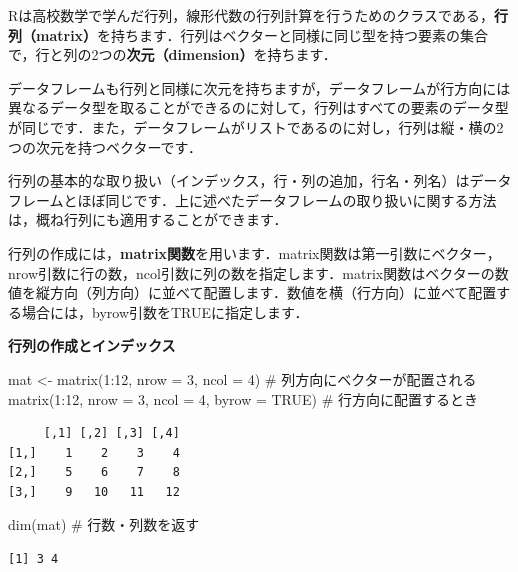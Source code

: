 \documentclass[
  letterpaper,
  DIV=11,
  numbers=noendperiod]{scrreprt}
\newenvironment{Shaded}{\begin{snugshade}}{\end{snugshade}}
\newcommand{\AttributeTok}[1]{\textcolor[rgb]{0.40,0.45,0.13}{#1}}
\newcommand{\CommentTok}[1]{\textcolor[rgb]{0.37,0.37,0.37}{#1}}
\newcommand{\ConstantTok}[1]{\textcolor[rgb]{0.56,0.35,0.01}{#1}}
\newcommand{\DecValTok}[1]{\textcolor[rgb]{0.68,0.00,0.00}{#1}}
\newcommand{\FunctionTok}[1]{\textcolor[rgb]{0.28,0.35,0.67}{#1}}
\newcommand{\NormalTok}[1]{\textcolor[rgb]{0.00,0.23,0.31}{#1}}
\newcommand{\OtherTok}[1]{\textcolor[rgb]{0.00,0.23,0.31}{#1}}
\newcommand{\SpecialCharTok}[1]{\textcolor[rgb]{0.37,0.37,0.37}{#1}}
\begin{document}
Rは高校数学で学んだ行列，線形代数の行列計算を行うためのクラスである，\textbf{行列（matrix）}を持ちます．行列はベクターと同様に同じ型を持つ要素の集合で，行と列の2つの\textbf{次元（dimension）}を持ちます．

データフレームも行列と同様に次元を持ちますが，データフレームが行方向には異なるデータ型を取ることができるのに対して，行列はすべての要素のデータ型が同じです．また，データフレームがリストであるのに対し，行列は縦・横の2つの次元を持つベクターです．

行列の基本的な取り扱い（インデックス，行・列の追加，行名・列名）はデータフレームとほぼ同じです．上に述べたデータフレームの取り扱いに関する方法は，概ね行列にも適用することができます．

行列の作成には，\textbf{matrix関数}を用います．matrix関数は第一引数にベクター，nrow引数に行の数，ncol引数に列の数を指定します．matrix関数はベクターの数値を縦方向（列方向）に並べて配置します．数値を横（行方向）に並べて配置する場合には，byrow引数をTRUEに指定します．

\textbf{行列の作成とインデックス}

\begin{Shaded}
\begin{Highlighting}[]
\NormalTok{mat }\OtherTok{\textless{}{-}} \FunctionTok{matrix}\NormalTok{(}\DecValTok{1}\SpecialCharTok{:}\DecValTok{12}\NormalTok{, }\AttributeTok{nrow =} \DecValTok{3}\NormalTok{, }\AttributeTok{ncol =} \DecValTok{4}\NormalTok{) }\CommentTok{\# 列方向にベクターが配置される}
\FunctionTok{matrix}\NormalTok{(}\DecValTok{1}\SpecialCharTok{:}\DecValTok{12}\NormalTok{, }\AttributeTok{nrow =} \DecValTok{3}\NormalTok{, }\AttributeTok{ncol =} \DecValTok{4}\NormalTok{, }\AttributeTok{byrow =} \ConstantTok{TRUE}\NormalTok{) }\CommentTok{\# 行方向に配置するとき}
\end{Highlighting}
\end{Shaded}

\begin{verbatim}
     [,1] [,2] [,3] [,4]
[1,]    1    2    3    4
[2,]    5    6    7    8
[3,]    9   10   11   12
\end{verbatim}

\begin{Shaded}
\begin{Highlighting}[]
\FunctionTok{dim}\NormalTok{(mat) }\CommentTok{\# 行数・列数を返す}
\end{Highlighting}
\end{Shaded}

\begin{verbatim}
[1] 3 4
\end{verbatim}
\end{document}
